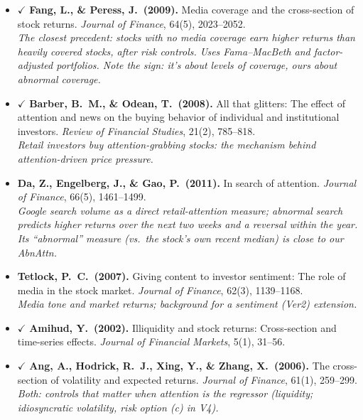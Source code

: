 \documentclass[11pt]{article}
\begin{document}
\begin{itemize}
  \item $\checkmark$ \textbf{Fang, L., \& Peress, J.\ (2009).} Media coverage and the cross-section of stock returns. \emph{Journal of Finance}, 64(5), 2023--2052.\\
  \textit{The closest precedent: stocks with no media coverage earn higher returns than heavily covered stocks, after risk controls. Uses Fama--MacBeth and factor-adjusted portfolios. Note the sign: it's about \emph{levels} of coverage, ours about \emph{abnormal} coverage.}
  \item $\checkmark$ \textbf{Barber, B.\ M., \& Odean, T.\ (2008).} All that glitters: The effect of attention and news on the buying behavior of individual and institutional investors. \emph{Review of Financial Studies}, 21(2), 785--818.\\
  \textit{Retail investors buy attention-grabbing stocks: the mechanism behind attention-driven price pressure.}
  \item \textbf{Da, Z., Engelberg, J., \& Gao, P.\ (2011).} In search of attention. \emph{Journal of Finance}, 66(5), 1461--1499.\\
  \textit{Google search volume as a direct retail-attention measure; abnormal search predicts higher returns over the next two weeks and a reversal within the year. Its ``abnormal'' measure (vs.\ the stock's own recent median) is close to our AbnAttn.}
  \item \textbf{Tetlock, P.\ C.\ (2007).} Giving content to investor sentiment: The role of media in the stock market. \emph{Journal of Finance}, 62(3), 1139--1168.\\
  \textit{Media tone and market returns; background for a sentiment (Ver2) extension.}
  \item $\checkmark$ \textbf{Amihud, Y.\ (2002).} Illiquidity and stock returns: Cross-section and time-series effects. \emph{Journal of Financial Markets}, 5(1), 31--56.
  \item $\checkmark$ \textbf{Ang, A., Hodrick, R.\ J., Xing, Y., \& Zhang, X.\ (2006).} The cross-section of volatility and expected returns. \emph{Journal of Finance}, 61(1), 259--299.\\
  \textit{Both: controls that matter when attention is the regressor (liquidity; idiosyncratic volatility, risk option (c) in V4).}
\end{itemize}
\end{document}

